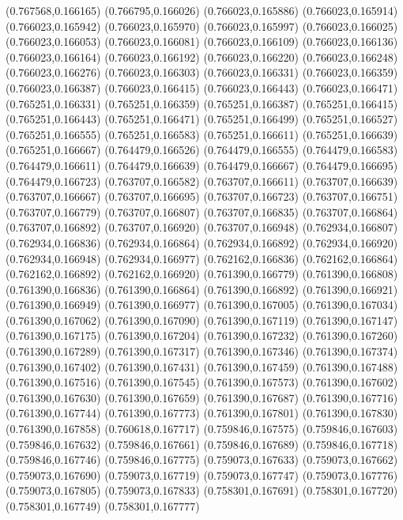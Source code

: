(0.767568,0.166165)
(0.766795,0.166026)
(0.766023,0.165886)
(0.766023,0.165914)
(0.766023,0.165942)
(0.766023,0.165970)
(0.766023,0.165997)
(0.766023,0.166025)
(0.766023,0.166053)
(0.766023,0.166081)
(0.766023,0.166109)
(0.766023,0.166136)
(0.766023,0.166164)
(0.766023,0.166192)
(0.766023,0.166220)
(0.766023,0.166248)
(0.766023,0.166276)
(0.766023,0.166303)
(0.766023,0.166331)
(0.766023,0.166359)
(0.766023,0.166387)
(0.766023,0.166415)
(0.766023,0.166443)
(0.766023,0.166471)
(0.765251,0.166331)
(0.765251,0.166359)
(0.765251,0.166387)
(0.765251,0.166415)
(0.765251,0.166443)
(0.765251,0.166471)
(0.765251,0.166499)
(0.765251,0.166527)
(0.765251,0.166555)
(0.765251,0.166583)
(0.765251,0.166611)
(0.765251,0.166639)
(0.765251,0.166667)
(0.764479,0.166526)
(0.764479,0.166555)
(0.764479,0.166583)
(0.764479,0.166611)
(0.764479,0.166639)
(0.764479,0.166667)
(0.764479,0.166695)
(0.764479,0.166723)
(0.763707,0.166582)
(0.763707,0.166611)
(0.763707,0.166639)
(0.763707,0.166667)
(0.763707,0.166695)
(0.763707,0.166723)
(0.763707,0.166751)
(0.763707,0.166779)
(0.763707,0.166807)
(0.763707,0.166835)
(0.763707,0.166864)
(0.763707,0.166892)
(0.763707,0.166920)
(0.763707,0.166948)
(0.762934,0.166807)
(0.762934,0.166836)
(0.762934,0.166864)
(0.762934,0.166892)
(0.762934,0.166920)
(0.762934,0.166948)
(0.762934,0.166977)
(0.762162,0.166836)
(0.762162,0.166864)
(0.762162,0.166892)
(0.762162,0.166920)
(0.761390,0.166779)
(0.761390,0.166808)
(0.761390,0.166836)
(0.761390,0.166864)
(0.761390,0.166892)
(0.761390,0.166921)
(0.761390,0.166949)
(0.761390,0.166977)
(0.761390,0.167005)
(0.761390,0.167034)
(0.761390,0.167062)
(0.761390,0.167090)
(0.761390,0.167119)
(0.761390,0.167147)
(0.761390,0.167175)
(0.761390,0.167204)
(0.761390,0.167232)
(0.761390,0.167260)
(0.761390,0.167289)
(0.761390,0.167317)
(0.761390,0.167346)
(0.761390,0.167374)
(0.761390,0.167402)
(0.761390,0.167431)
(0.761390,0.167459)
(0.761390,0.167488)
(0.761390,0.167516)
(0.761390,0.167545)
(0.761390,0.167573)
(0.761390,0.167602)
(0.761390,0.167630)
(0.761390,0.167659)
(0.761390,0.167687)
(0.761390,0.167716)
(0.761390,0.167744)
(0.761390,0.167773)
(0.761390,0.167801)
(0.761390,0.167830)
(0.761390,0.167858)
(0.760618,0.167717)
(0.759846,0.167575)
(0.759846,0.167603)
(0.759846,0.167632)
(0.759846,0.167661)
(0.759846,0.167689)
(0.759846,0.167718)
(0.759846,0.167746)
(0.759846,0.167775)
(0.759073,0.167633)
(0.759073,0.167662)
(0.759073,0.167690)
(0.759073,0.167719)
(0.759073,0.167747)
(0.759073,0.167776)
(0.759073,0.167805)
(0.759073,0.167833)
(0.758301,0.167691)
(0.758301,0.167720)
(0.758301,0.167749)
(0.758301,0.167777)
